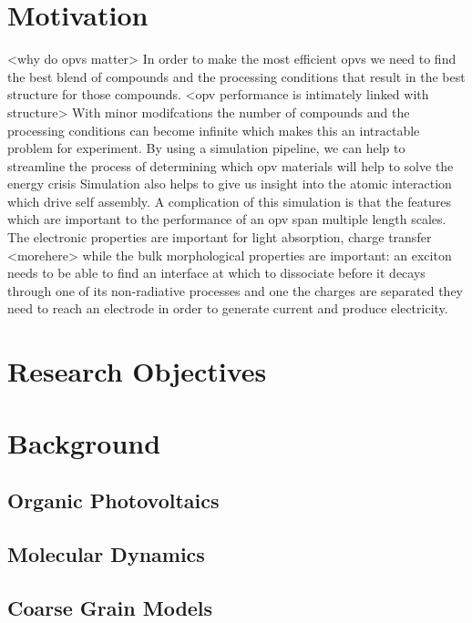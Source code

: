 \section*{Motivation}
<why do opvs matter>
In order to make the most efficient opvs we need to find the best blend of compounds and the processing conditions that result in the best structure for those compounds.
<opv performance is intimately linked with structure>
With minor modifcations the number of compounds and the processing conditions can become infinite which makes this an intractable problem for experiment.
By using a simulation pipeline, we can help to streamline the process of determining which opv materials will help to solve the energy crisis
Simulation also helps to give us insight into the atomic interaction which drive self assembly.
A complication of this simulation is that the features which are important to the performance of an opv span multiple length scales.
The electronic properties are important for light absorption, charge transfer <morehere>
while the bulk morphological properties are important: an exciton needs to be able to find an interface at which to dissociate before it decays through one of its non-radiative processes and one the charges are separated they need to reach an electrode in order to generate current and produce electricity.

\section*{Research Objectives}

\section*{Background}

\subsection*{Organic Photovoltaics}

\subsection*{Molecular Dynamics}

\subsection*{Coarse Grain Models}

